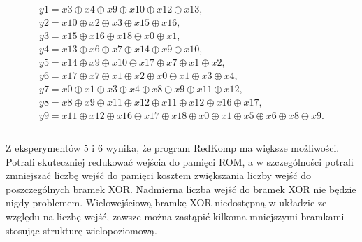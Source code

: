 \begin{multline} \\
y1 = x3 \oplus x4 \oplus x9 \oplus x10 \oplus x12 \oplus x13, \\
y2 = x10 \oplus x2 \oplus x3 \oplus x15 \oplus x16, \\
y3 = x15 \oplus x16 \oplus x18 \oplus x0 \oplus x1, \\
y4 = x13 \oplus x6 \oplus x7 \oplus x14 \oplus x9 \oplus x10, \\
y5 = x14 \oplus x9 \oplus x10 \oplus x17 \oplus x7 \oplus x1 \oplus x2, \\
y6 = x17 \oplus x7 \oplus x1 \oplus x2 \oplus x0 \oplus x1 \oplus x3 \oplus x4, \\
y7 = x0 \oplus x1 \oplus x3 \oplus x4 \oplus x8 \oplus x9 \oplus x11 \oplus x12, \\
y8 = x8 \oplus x9 \oplus x11 \oplus x12 \oplus x11 \oplus x12 \oplus x16 \oplus x17, \\
y9 = x11 \oplus x12 \oplus x16 \oplus x17 \oplus x18 \oplus x0 \oplus x1 \oplus x5 \oplus x6 \oplus x8 \oplus x9. \\
\end{multline} \\

Z eksperymentów 5 i 6 wynika, że program RedKomp ma większe możliwości.
Potrafi skuteczniej redukować wejścia do pamięci ROM,
a w szczególności potrafi zmniejszać liczbę wejść do pamięci
kosztem zwiększania liczby wejść do poszczególnych bramek XOR.
Nadmierna liczba wejść do bramek XOR nie będzie nigdy problemem.
Wielowejściową bramkę XOR niedostępną w układzie ze względu na liczbę wejść,
zawsze można zastąpić kilkoma mniejszymi bramkami stosując strukturę wielopoziomową.
